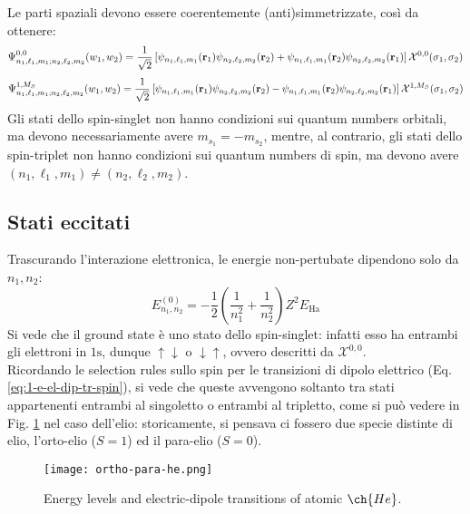 Le parti spaziali devono essere coerentemente (anti)simmetrizzate, così da ottenere:
\begin{equation*}
	\Psi^{0,0}_{n_1, \ell_1, m_1 ; n_2, \ell_2, m_2}(w_1, w_2) = \frac{1}{\sqrt{2}} \left[ \psi_{n_1, \ell_1, m_1}(\mathbf{r}_1) \psi_{n_2, \ell_2, m_2}(\mathbf{r}_2) + \psi_{n_1, \ell_1, m_1}(\mathbf{r}_2) \psi_{n_2, \ell_2, m_2}(\mathbf{r}_1) \right] \mathcal{X}^{0,0}(\sigma_1, \sigma_2)
\end{equation*}
\begin{equation*}
	\Psi^{1,M_S}_{n_1, \ell_1, m_1 ; n_2, \ell_2, m_2}(w_1, w_2) = \frac{1}{\sqrt{2}} \left[ \psi_{n_1, \ell_1, m_1}(\mathbf{r}_1) \psi_{n_2, \ell_2, m_2}(\mathbf{r}_2) - \psi_{n_1, \ell_1, m_1}(\mathbf{r}_2) \psi_{n_2, \ell_2, m_2}(\mathbf{r}_1) \right] \mathcal{X}^{1,M_S}(\sigma_1, \sigma_2)
\end{equation*}
Gli stati dello spin-singlet non hanno condizioni sui quantum numbers orbitali, ma devono necessariamente avere $ m_{s_1} = - m_{s_2} $, mentre, al contrario, gli stati dello spin-triplet non hanno condizioni sui quantum numbers di spin, ma devono avere $ (n_1,\ell_1,m_1) \neq (n_2,\ell_2,m_2) $.

\subsection{Stati eccitati}

Trascurando l'interazione elettronica, le energie non-pertubate dipendono solo da $ n_1,n_2 $:
\begin{equation*}
	E_{n_1,n_2}^{(0)} = - \frac{1}{2} \left( \frac{1}{n_1^2} + \frac{1}{n_2^2} \right) Z^2 E_\text{Ha}
\end{equation*}
Si vede che il ground state è uno stato dello spin-singlet: infatti esso ha entrambi gli elettroni in $ \text{1s} $, dunque $ \uparrow\downarrow $ o $ \downarrow\uparrow $, ovvero descritti da $ \mathcal{X}^{0,0} $. \\
Ricordando le selection rules sullo spin per le transizioni di dipolo elettrico (Eq. \ref{eq:1-e-el-dip-tr-spin}), si vede che queste avvengono soltanto tra stati appartenenti entrambi al singoletto o entrambi al tripletto, come si può vedere in Fig. \ref{helium} nel caso dell'elio: storicamente, si pensava ci fossero due specie distinte di elio, l'orto-elio ($ S = 1 $) ed il para-elio ($ S = 0 $).

\begin{figure}
	\centering
	\texttt{[image: ortho-para-he.png]}
	\caption{Energy levels and electric-dipole transitions of atomic $ \ch{He} $.}
	\label{helium}
\end{figure}

